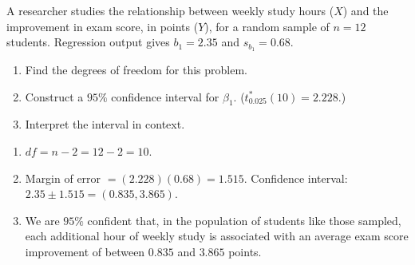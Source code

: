 \begin{Exercise}[title={Reading Computer Output}, label={ex:slope-ci-1}]
A researcher studies the relationship between weekly study hours ($X$) and the improvement in exam score, in points ($Y$), for a random sample of $n = 12$ students. Regression output gives $b_1 = 2.35$ and $s_{b_1} = 0.68$.
\begin{enumerate}
    \item Find the degrees of freedom for this problem.
    \item Construct a $95\%$ confidence interval for $\beta_1$. ($t^*_{0.025}(10) = 2.228$.)
    \item Interpret the interval in context.
\end{enumerate}
\end{Exercise}

\begin{Answer}[ref={ex:slope-ci-1}]
\begin{enumerate}
    \item $df = n - 2 = 12 - 2 = 10$.
    \item Margin of error $= (2.228)(0.68) = 1.515$. Confidence interval: $2.35 \pm 1.515 = (0.835, 3.865)$.
    \item We are $95\%$ confident that, in the population of students like those sampled, each additional hour of weekly study is associated with an average exam score improvement of between $0.835$ and $3.865$ points.
\end{enumerate}
\end{Answer}
%
%
